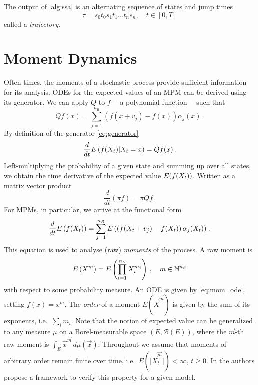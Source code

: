 The output of \autoref{alg:ssa} is an alternating sequence of states and jump times
\[
	\tau = s_0t_0s_1t_1\dots t_n s_n, \quad t\in[0,T]
\]
called a \emph{trajectory}.


\section{Moment Dynamics}\label{sec:moments_bg}
Often times, the moments of a stochastic process provide sufficient information for its analysis.
\acp{ODE} for the expected values of an \ac{MPM} can be derived using its generator.
We can apply $Q$ to $f$ --~a polynomial function~-- such that
\begin{equation}\label{eq:Qf}
	Qf(x) = \sum_{j=1}^{n_R}\left(f(x+v_j) - f(x)\right)\alpha_j(x)\,.
\end{equation}
By definition of the generator \eqref{eq:generator}
\[
	\frac{d}{dt}{E}\left(f(X_t)|X_t=x\right) = Qf(x)\,.
\]
Left-multiplying the probability of a given state and summing up over all states, we
obtain the time derivative of the expected value ${E}(f(X_t))$.
Written as a matrix vector product
\[
	\frac{d}{dt}(\pi f) = \pi Qf\,.
\]
For \acp{MPM}, in particular, we arrive at the functional form
\begin{equation}\label{eq:mom_ode}
	\frac{d}{dt}{E}\left(f({X}_t)\right) = \sum_{j=1}^{n_R}{E}\left(\left(f({X_t +
	v_j}) - f(X_t)\right)\alpha_j(X_t)\right)\,.
\end{equation}
This equation is used to analyse (raw) \emph{moments} of the process.
A raw moment is
\[{E}\left(X^{m}\right)={E}\left(\prod_{i=1}^{n_S} X_i^{m_i}\right)\,,\quad m\in {\mathbb{N}}^{n_S}\]
with respect to some probability measure.
An \ac{ODE} is given by \eqref{eq:mom_ode}, setting $f(x)=x^m$.
The \emph{order} of a moment $E({\vec X}^{\vec m})$ is given by the sum of its exponents,
i.e.\ $\sum_i m_i$.
Note that the notion of  expected value can be generalized
to any measure $\mu$ on a Borel-measurable space
$(E, \mathcal{B}(E))$, where
 the $\vec{m}$-th raw moment is $\int_E {\vec x}^{\vec m}\,d\mu(\vec x)$.
Throughout we assume that moments of arbitrary order remain finite over time,
i.e.\ $E(\lvert \vec{X}^{\vec{m}}_t\rvert)<\infty$, $t\geq 0$.
In \citet{gupta2014scalable} the authors propose a framework to verify
this property for a given model.

